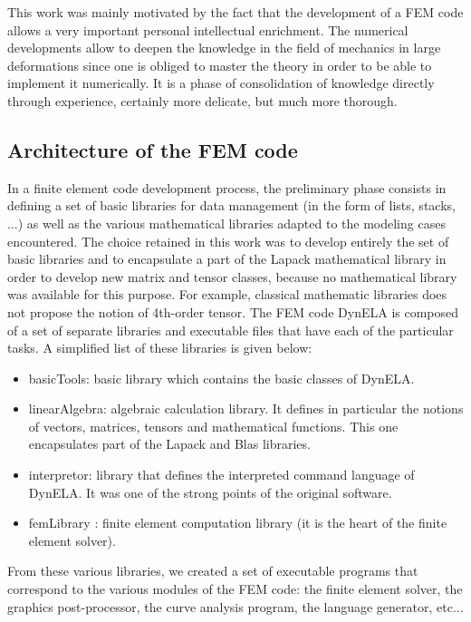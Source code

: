This work was mainly motivated by the fact that the development of a FEM code allows a very important personal intellectual enrichment. The numerical developments allow to deepen the knowledge in the field of mechanics in large deformations since one is obliged to master the theory in order to be able to implement it numerically. It is a phase of consolidation of knowledge directly through experience, certainly more delicate, but much more thorough.

\subsection{Architecture of the FEM code}

In a finite element code development process, the preliminary phase consists in defining a set of basic libraries for data management (in the form of lists, stacks, ...) as well as the various mathematical libraries adapted to the modeling cases encountered. The choice retained in this work was to develop entirely the set of basic libraries and to encapsulate a part of the Lapack \cite{Lapack:1999} mathematical library in order to develop new matrix and tensor classes, because no mathematical library was available for this purpose. For example, classical mathematic libraries does not propose the notion of 4th-order tensor. The FEM code DynELA is composed of a set of separate libraries and executable files that have each of the particular tasks. A simplified list of these libraries is given below:
\begin{itemize}
\item basicTools: basic library which contains the basic classes of DynELA.
\item linearAlgebra: algebraic calculation library. It defines in particular the notions of vectors, matrices, tensors and mathematical functions. This one encapsulates part of the Lapack and Blas libraries.
\item interpretor: library that defines the interpreted command language of DynELA. It was one of the strong points of the original software.
\item femLibrary : finite element computation library (it is the heart of the finite element solver).
\end{itemize}
From these various libraries, we created a set of executable programs that correspond to the various modules of the FEM code: the finite element solver, the graphics post-processor, the curve analysis program, the language generator, etc...

